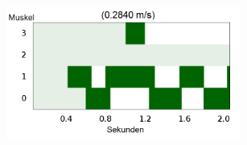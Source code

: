 \documentclass{beamer}
\begin{document}
\begin{frame}
\begin{columns}
\begin{figure}
		\end{figure}
		\begin{figure}
			\includegraphics[width=0.9\textwidth]{img/hum21.png}
		\end{figure}
	\end{columns}
\end{frame}
\end{document}
